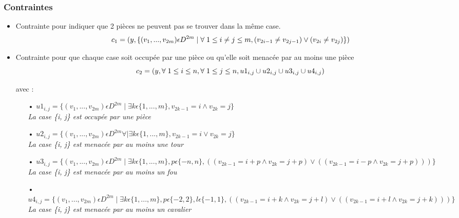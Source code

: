 \documentclass[a4paper,11pt]{article}
\begin{document}
\subsubsection{Contraintes}
\begin{itemize}
\item Contrainte pour indiquer que 2 pièces ne peuvent pas se trouver dans la même case.
   $$c_{1} = ( y, \{ (v_{1}, ..., v_{2m}) \epsilon  D^{2m} \mid \forall \hspace{0.1cm} 1\leq i \neq j \leq m, (v_{2i-1} \neq v_{2j-1}) \vee  (v_{2i} \neq v_{2j}) \} )$$ 

 \item Contrainte pour que chaque case soit occupée par une pièce ou qu'elle soit menacée par au moins une pièce
    $$c_{2} = (y, \forall \hspace{0.1cm} 1 \leq i \leq n, \forall \hspace{0.1cm} 1 \leq j \leq n,  u1_{i,j} \cup u2_{i,j} \cup u3_{i,j} \cup u4_{i,j})$$
    
    avec : \begin{itemize}
    \item[•] $u1_{i,j} = \{(v_{1}, ..., v_{2m}) \epsilon  D^{2m} \mid \exists k \epsilon \{1, ..., m\}, v_{2k-1} = i \wedge v_{2k} = j\}$ \\
    \textit{La case \{i, j\} est occupée par une pièce}\\
   
   
    \item[•] $u2_{i,j} = \{(v_{1}, ..., v_{2m}) \epsilon  D^{2m} \forall \mid \exists k \epsilon \{1, ..., m\}, v_{2k-1} = i \vee v_{2k} = j\}$ \\
    \textit{La case \{i, j\} est menacée par au moins une tour}\\
    
    
    \item[•] $u3_{i,j} = \{(v_{1}, ..., v_{2m}) \epsilon  D^{2m} \mid \exists k \epsilon \{1, ..., m\}, p \epsilon\{-n, n \}, ((v_{2k-1} = i+p \wedge v_{2k} = j+p) \vee ((v_{2k-1} = i-p \wedge v_{2k} = j+p))) \}$ \\
    \textit{La case \{i, j\} est menacée par au moins un fou}\\
    
    
    \item[•] $u4_{i,j} = \{(v_{1}, ..., v_{2m}) \epsilon  D^{2m} \mid \exists k \epsilon \{1, ..., m\}, p \epsilon \{-2, 2 \}, l \epsilon \{-1, 1\},
    ((v_{2k-1} = i+k \wedge v_{2k} = j+l)  \vee ((v_{2k-1} = i+l \wedge v_{2k} = j+k)))\}$ \\
    \textit{La case \{i, j\} est menacée par au moins un cavalier}\\
    
    \end{itemize}
    
\end{itemize}
\end{document}
